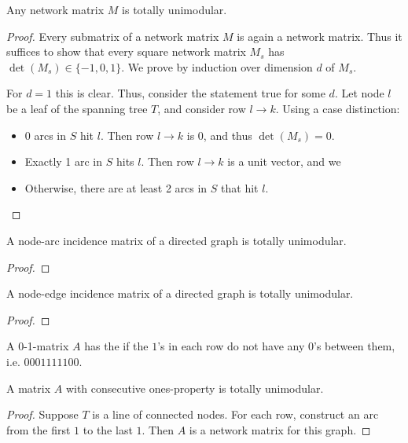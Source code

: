 \begin{theorem}
    Any network matrix $M$ is totally unimodular.
\end{theorem}
\begin{proof}
    Every submatrix of a network matrix $M$ is again a network matrix.
    Thus it suffices to show that every square network matrix $M_s$ has $\det(M_s)\in \{-1,0,1\}$.
    We prove by induction over dimension $d$ of $M_s$.

    For $d=1$ this is clear. Thus, consider the statement true for some $d$.
    Let node $l$ be a leaf of the spanning tree $T$, and consider row $l \rightarrow k$. Using a case distinction:
    \begin{itemize}
        \item 0 arcs in $S$ hit $l$. Then row $l \rightarrow k$ is $0$, and thus $\det(M_s)=0$.
        \item Exactly 1 arc in $S$ hits $l$. Then row $l \rightarrow k$ is a unit vector, and we
        \item Otherwise, there are at least 2 arcs in $S$ that hit $l$.
    \end{itemize}
\end{proof}
\begin{corollary}
    A node-arc incidence matrix of a directed graph is totally unimodular.
\end{corollary}
\begin{proof}

\end{proof}
\begin{corollary}
    A node-edge incidence matrix of a directed graph is totally unimodular.
\end{corollary}
\begin{proof}

\end{proof}
\begin{definition}
    A 0-1-matrix $A$ has the  if the $1$'s in each row
    do not have any $0$'s between them, i.e. $0001111100$.
\end{definition}
\begin{corollary} \label{thm:cop-is-tu}
    A matrix $A$ with consecutive ones-property is totally unimodular.
\end{corollary}
\begin{proof}
    Suppose $T$ is a line of connected nodes.
    For each row, construct an arc from the first $1$ to the last $1$. Then $A$ is a network matrix for this graph.
\end{proof}
